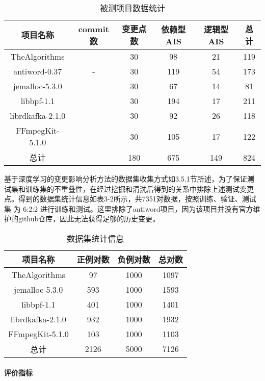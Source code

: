 \begin{table}[htbp]
\caption{被测项目数据统计}
\vspace{0.5em}\centering\wuhao
\begin{tabular}{cccccc}
\toprule
项目名称 & commit数 & 变更点数 & 依赖型AIS & 逻辑型AIS & 总计 \\
\midrule
TheAlgorithms &  & 30 & 98 & 21 & 119\\
antiword-0.37 & - & 30 & 119 & 54 & 173 \\
jemalloc-5.3.0 &   & 30 & 67 & 14 & 81 \\
libbpf-1.1 &  & 30 & 194 & 17 & 211 \\
librdkafka-2.1.0 &  & 30 & 92 & 26 & 118\\
FFmpegKit-5.1.0 &  & 30 & 105 & 17 & 122\\
总计 &  & 180 & 675 & 149 & 824 \\
\bottomrule
\end{tabular}
\end{table}


基于深度学习的变更影响分析方法的数据集收集方式如3.5.1节所述，为了保证测试集和训练集的不重叠性，在经过挖掘和清洗后得到的关系中排除上述测试变更点。得到的数据集统计信息如表3-2所示，共7351对数据，按照训练、验证、测试集 为 6:2:2 进行训练和测试。这里排除了antiword项目，因为该项目并没有官方维护的github仓库，因此无法获得足够的历史变更。

\begin{table}[htbp]
\caption{数据集统计信息}
\vspace{0.5em}\centering\wuhao
\begin{tabular}{cccc}
\toprule
项目名称 & 正例对数 & 负例对数 & 总对数 \\
\midrule
TheAlgorithms & 97 & 1000 & 1097 \\
jemalloc-5.3.0 & 593 & 1000 & 1593 \\
libbpf-1.1 & 401 & 1000 & 1401 \\
librdkafka-2.1.0 & 932  & 1000 & 1932 \\
FFmpegKit-5.1.0 & 103 & 1000 & 1103 \\ 
总计 & 2126 & 5000 & 7126 \\
\bottomrule
\end{tabular}
\end{table}

\paragraph{评价指标}

